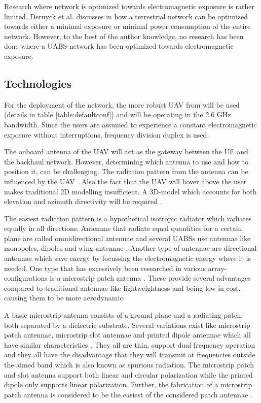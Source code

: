\documentclass[twocolumn]{phdsymp} %
\begin{document}
Research where network is optimized towards electromagnetic exposure is rather limited.
Deruyck et al. discusses in \cite{J1} how a terrestrial network can be optimized towards either a minimal exposure or minimal power consumption of the entire network.
However, to the best of the author knowledge, no research has been done where a \gls{UABS}-network has been optimized towards electromagnetic exposure.

\subsection{Technologies}
For the deployment of the network, the more robust \gls{UAV} from \cite{J2} will be used (details in table \ref{table:defaultconf}) and will be operating in the 2.6 GHz 
bandwidth. Since the users are assumed to experience a constant electromagnetic exposure without interruptions, frequency division duplex is used.

The onboard antenna of the \gls{UAV} will act as the gateway between the UE and the backhaul network.
However, determining which antenna to use and how to position it, can be challenging.
The radiation pattern from the antenna can be influenced by the \gls{UAV} \cite{A1}.
Also the fact that the \gls{UAV} will hover above the user makes traditional 2D modelling insufficient.
A 3D-model which accounts for both elevation and azimuth directivity 
will be required \cite{U12}.

The easiest radiation pattern is a hypothetical isotropic radiator which radiates equally in all directions.
Antennae that radiate equal quantities for a certain plane are called omnidirectional antennae \cite{U12} and several 
\gls{UABS}s use antennae like monopoles, dipoles and wing antennae \cite{A4,A10,A11,A12}.
Another type of antennae are directional antennae which save energy by focussing the electromagnetic energy where it 
is needed. One type 
that has excessively been researched in various array-configurations is a microstrip patch antenna \cite{A5,A6,A8}.
These provide several advantages compared to traditional antennae \cite{J13_microstripadvantages,J14_antennadesign}
like lightweightness and being low in cost, causing them to be more aerodynamic. 

A basic microstrip antenna consists of a ground plane and
a radiating patch, both separated by a dielectric substrate. 
Several variations exist like microstrip patch antennae, microstrip slot antennae and printed dipole antennae which
all have similar characteristics \cite{J13_microstripadvantages,J14_antennadesign}. 
They all are thin, support dual frequency operation and they all have the disadvantage that 
they 
will transmit at frequencies outside the aimed band which is also known as
spurious radiation. The microstrip patch and slot antenna support both linear
and circular polarization while the printed dipole only supports linear polarization. 
Further, the fabrication of a microstrip patch antenna is considered to be the easiest 
of the considered patch antennae \cite{J13_microstripadvantages}. 
\end{document}

